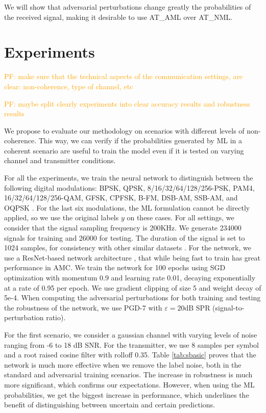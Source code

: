 \documentclass[conference]{IEEEtran}
\newcommand{\pf}[1]{{\textcolor{orange}{PF: {#1}}}}
\begin{document}
We will show that adversarial perturbations change greatly the probabilities of the received signal, making it desirable to use AT\_AML over AT\_NML.


\section{Experiments}

\pf{make sure that the technical aspects of the communication settings, are clear: non-coherence, type of channel, etc}

\pf{maybe split clearly experiments into clear accuracy results and robustness results}

We propose to evaluate our methodology on scenarios with different levels of non-coherence. This way, we can verify if the probabilities generated by ML in a coherent scenario are useful to train the model even if it is tested on varying channel and transmitter conditions. 

For all the experiments, we train the neural network to distinguish between the following digital modulations: BPSK, QPSK, 8/16/32/64/128/256-PSK, PAM4, 16/32/64/128/256-QAM, GFSK, CPFSK, B-FM, DSB-AM, SSB-AM, and OQPSK \cite{Rajendran_Meert_Giustiniano_Lenders_Pollin_2018,Guo_Jiang_Wu_Zhou_2020}. For the last six modulations, the ML formulation cannot be directly applied, so we use the original labels $y$ on these cases.
For all settings, we consider that the signal sampling frequency is 200KHz. We generate 234000 signals for training and 26000 for testing. The duration of the signal is set to 1024 samples, for consistency with other similar datasets \cite{OShea_West_2016}. For the network, we use a ResNet-based network architecture \cite{OShea_Roy_Clancy_2018}, that while being fast to train has great performance in AMC. We train the network for 100 epochs using SGD optimization with momentum 0.9 and learning rate 0.01, decaying exponentially at a rate of 0.95 per epoch. We use gradient clipping of size 5 and weight decay of 5e-4. When computing the adversarial perturbations for both training and testing the robustness of the network, we use PGD-7 with $\varepsilon=20 \text{dB SPR}$ (signal-to-perturbation ratio).

For the first scenario, we consider a gaussian channel with varying levels of noise ranging from -6 to 18 dB SNR. For the transmitter, we use 8 samples per symbol and a root raised cosine filter with rolloff 0.35. Table \ref{tab:sbasic} proves that the network is much more effective when we remove the label noise, both in the standard and adversarial training scenarios. The increase in robustness is much more significant, which confirms our expectations. However, when using the ML probabilities, we get the biggest increase in performance, which underlines the benefit of distinguishing between uncertain and certain predictions.
\end{document}
